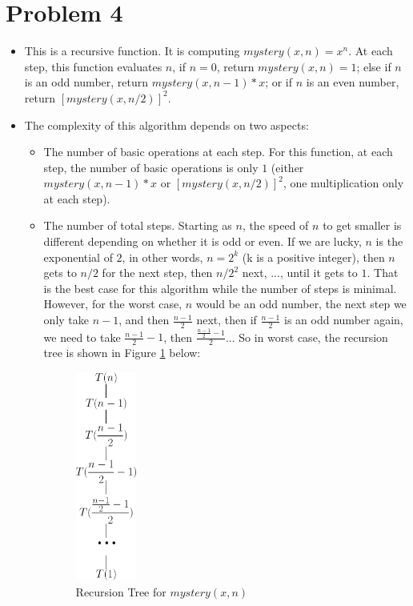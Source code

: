 \section*{Problem 4}
\begin{itemize}
\item This is a recursive function. It is computing $mystery(x, n) = x^n$. At each step, this function evaluates $n$, if $n = 0$, return $mystery(x, n) = 1$; else if $n$ is an odd number, return $mystery(x, n-1)*x$; or if $n$ is an even number, return $[mystery(x, n/2)]^2$. 


\item The complexity of this algorithm depends on two aspects: 
\begin{itemize}
\item The number of basic operations at each step. For this function, at each step, the number of basic operations is only $1$ (either $mystery(x, n-1)*x$ or $[mystery(x, n/2)]^2$, one multiplication only at each step). 
\item The number of total steps. Starting as $n$, the speed of $n$ to get smaller is different depending on whether it is odd or even. If we are lucky, $n$ is the exponential of $2$, in other words, $n = 2^k$ (k is a positive integer), then $n$ gets to $n/2$ for the next step, then $n/2^2$ next, ..., until it gets to $1$. That is the best case for this algorithm while the number of steps is minimal. However, for the worst case, $n$ would be an odd number, the next step we only take $n-1$, and then $\frac{n-1}{2}$ next, then if $\frac{n-1}{2}$ is an odd number again, we need to take $\frac{n-1}{2}-1$, then $\frac{\frac{n-1}{2}-1}{2}$... So in worst case, the recursion tree is shown in Figure \ref{recursion} below: 

\begin{figure}[htb]
\centering
\includegraphics[width=2cm]{p4.png}
\caption{Recursion Tree for $mystery(x,n)$}
\label{recursion}
\end{figure}


\end{itemize}
\end{itemize}
